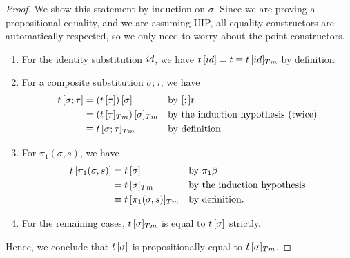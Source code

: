 \documentclass[a4paper,UKenglish,numberwithinsect,cleveref,thm-restate]{lipics-v2021}
\begin{document}
\propCorrectness*
\begin{proof}
  We show this statement by induction on $\sigma$. Since we are proving a propositional equality, and we are assuming UIP, all equality constructors are automatically respected, so we only need to worry about the point constructors.
  \begin{enumerate}
    \item For the identity substitution $\idS$, we have $\sub{t}{\idS} = t \judgeq \subTm{t}{\idS}$ by definition.
    \item For a composite substitution $\sigma; \tau$, we have
      \begin{align*}
        \sub{t}{\sigma;\tau} & = \sub{(\sub{t}{\tau})}{\sigma}            && \text{by $[;]t$} \\
                       & = \subTm{(\subTm{t}{\tau})}{\sigma} && \text{by the induction hypothesis (twice)} \\ %
                       & \judgeq \subTm{t}{\sigma;\tau} && \text{by definition.}
      \end{align*}
    \item For $\pi_1(\sigma, s)$, we have
      \begin{align*}
        \sub{t}{\pi_1(\sigma, s)} & = \sub{t}{\sigma}               && \text{by $\pi_1\beta$} \\
                            & = \subTm{t}{\sigma}       && \text{by the induction hypothesis} \\ %
                            & \judgeq \subTm{t}{\pi_1(\sigma, s)} && \text{by definition.}
      \end{align*}
    \item For the remaining cases, $\subTm{t}{\sigma}$ is equal to ${t}\,[\sigma]$ strictly.
  \end{enumerate}
  Hence, we conclude that ${t}\,[\sigma]$ is propositionally equal to $\subTm{t}{\sigma}$.
\end{proof}
\end{document}
